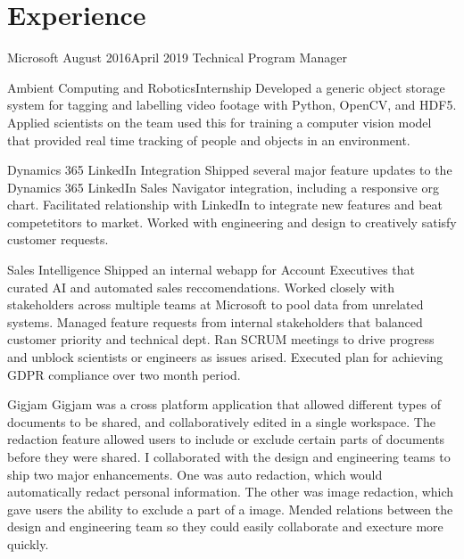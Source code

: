\documentclass[]{../resume}
\author{Caleb Thorsteinson}
\begin{document}

\section{Experience}

\begin{employer}[../microsoft]{Microsoft} {August 2016}{April 2019}
  {Technical Program Manager}
\begin{team}{Ambient Computing and Robotics}{Internship}
  Developed a generic object storage system for tagging and labelling
  video footage with Python, OpenCV, and HDF5. Applied scientists on
  the team used this for training a computer vision model that
  provided real time tracking of people and objects in an environment.
\end{team}
\begin{team}{Dynamics 365 LinkedIn Integration}{}
  Shipped several major feature updates to the Dynamics 365 LinkedIn
  Sales Navigator integration, including a responsive org
  chart. Facilitated relationship with LinkedIn to integrate new
  features and beat competetitors to market. Worked with engineering
  and design to creatively satisfy customer requests.
\end{team}
\begin{team}{Sales Intelligence}{}
  Shipped an internal webapp for Account Executives that curated AI
  and automated sales reccomendations. Worked closely with
  stakeholders across multiple teams at Microsoft to pool data from
  unrelated systems. Managed feature requests from internal
  stakeholders that balanced customer priority and technical dept. Ran
  SCRUM meetings to drive progress and unblock scientists or engineers
  as issues arised. Executed plan for achieving GDPR compliance over
  two month period.  %
\end{team}
\begin{team}{Gigjam}{}
  Gigjam was a cross platform application that allowed different types
  of documents to be shared, and collaboratively edited in a single
  workspace. The redaction feature allowed users to include or exclude
  certain parts of documents before they were shared. I collaborated
  with the design and engineering teams to ship two major
  enhancements. One was auto redaction, which would automatically
  redact personal information. The other was image redaction, which
  gave users the ability to exclude a part of a image. Mended
  relations between the design and engineering team so they could
  easily collaborate and execture more quickly.
\end{team}
\end{employer}
\end{document}
